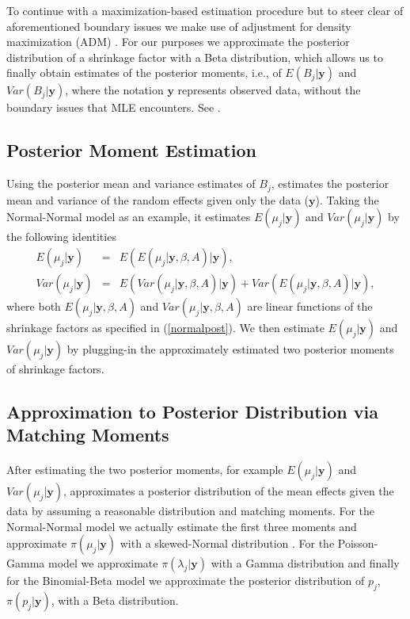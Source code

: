 \documentclass[article]{jss}
\begin{document}
To continue with a maximization-based estimation procedure but to steer clear of aforementioned boundary issues we make use of adjustment for density maximization (ADM) \citep{carl1988, 1997, 2011}. For our purposes we approximate the posterior distribution of a shrinkage factor with a Beta distribution, which allows us to finally obtain estimates of the posterior moments, i.e.,  of $E(B_{j}\vert\textbf{y})$ and $Var(B_{j}\vert\textbf{y})$, where the notation $\textbf{y}$ represents observed data, without the boundary issues that MLE encounters. See \cite{2011}.

\subsection[Posterior Moment Estimation]{Posterior Moment Estimation}

Using the posterior mean and variance estimates of $B_{j}$,  estimates the posterior mean and variance of the random effects given only the data ($\textbf{y}$). Taking the Normal-Normal model as an example, it estimates $E(\mu_{j}\vert \textbf{y})$ and $Var(\mu_{j}\vert \textbf{y})$ by the following identities
\begin{eqnarray}
E(\mu_{j}\vert \textbf{y}) & = & E(E(\mu_{j}\vert \textbf{y}, \beta, A)\vert \textbf{y}), \\
Var(\mu_{j}\vert \textbf{y}) & = & E(Var(\mu_{j}\vert \textbf{y}, \beta, A)\vert \textbf{y})+Var(E(\mu_{j}\vert \textbf{y}, \beta, A)\vert \textbf{y}),
\end{eqnarray}  
where both $E(\mu_{j}\vert \textbf{y}, \beta, A)$ and $Var(\mu_{j}\vert \textbf{y}, \beta, A)$ are linear functions of the shrinkage factors as specified in (\ref{normalpost}). We then estimate $E(\mu_{j}\vert \textbf{y})$ and $Var(\mu_{j}\vert \textbf{y})$ by plugging-in the approximately estimated two posterior moments of shrinkage factors.

\subsection[Approximation to Posterior Distribution by Moment Matching]{Approximation to Posterior Distribution via Matching Moments}
After estimating the two posterior moments, for example $E(\mu_{j}\vert \textbf{y})$ and $Var(\mu_{j}\vert \textbf{y})$,  approximates a posterior distribution of the mean effects given the data by assuming a reasonable distribution and matching moments. For the Normal-Normal model we actually estimate the first three moments and approximate $\pi(\mu_{j}\vert \textbf{y})$ with a skewed-Normal distribution \citep{sn2013}. For the Poisson-Gamma model we approximate $\pi(\lambda_{j}\vert \textbf{y})$ with a Gamma distribution and finally for the Binomial-Beta model we approximate the posterior distribution of $p_{j}$, $\pi(p_{j}\vert \textbf{y})$, with a Beta distribution.
\end{document}
